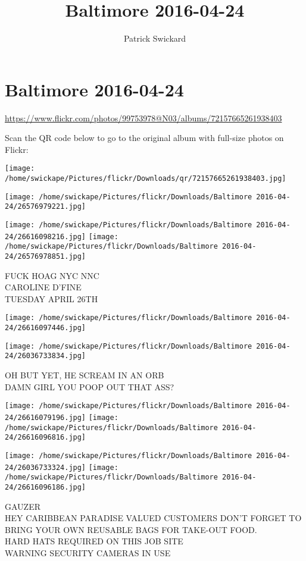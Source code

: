\documentclass[10pt,letterpaper]{article}
\title{Baltimore 2016-04-24}
\author{Patrick Swickard}
\date{}
\begin{document}
\section*{Baltimore 2016-04-24}

\url{https://www.flickr.com/photos/99753978@N03/albums/72157665261938403}

Scan the QR code below to go to the original album with full-size photos on Flickr:

\texttt{[image: /home/swickape/Pictures/flickr/Downloads/qr/72157665261938403.jpg]}
\pagebreak

\texttt{[image: /home/swickape/Pictures/flickr/Downloads/Baltimore 2016-04-24/26576979221.jpg]}

\vspace{0.25in}
\texttt{[image: /home/swickape/Pictures/flickr/Downloads/Baltimore 2016-04-24/26616098216.jpg]}
\texttt{[image: /home/swickape/Pictures/flickr/Downloads/Baltimore 2016-04-24/26576978851.jpg]}

FUCK HOAG NYC NNC\\
CAROLINE D'FINE\\
TUESDAY APRIL 26TH
\pagebreak

\texttt{[image: /home/swickape/Pictures/flickr/Downloads/Baltimore 2016-04-24/26616097446.jpg]}

\vspace{0.25in}
\texttt{[image: /home/swickape/Pictures/flickr/Downloads/Baltimore 2016-04-24/26036733834.jpg]}

OH BUT YET, HE SCREAM IN AN ORB\\
DAMN GIRL YOU POOP OUT THAT ASS?
\pagebreak

\texttt{[image: /home/swickape/Pictures/flickr/Downloads/Baltimore 2016-04-24/26616079196.jpg]}
\texttt{[image: /home/swickape/Pictures/flickr/Downloads/Baltimore 2016-04-24/26616096816.jpg]}

\texttt{[image: /home/swickape/Pictures/flickr/Downloads/Baltimore 2016-04-24/26036733324.jpg]}
\texttt{[image: /home/swickape/Pictures/flickr/Downloads/Baltimore 2016-04-24/26616096186.jpg]}

GAUZER\\
HEY CARIBBEAN PARADISE VALUED CUSTOMERS DON'T FORGET TO BRING YOUR OWN REUSABLE BAGS FOR TAKE{-}OUT FOOD.\\
HARD HATS REQUIRED ON THIS JOB SITE\\
WARNING SECURITY CAMERAS IN USE
\pagebreak
\end{document}
